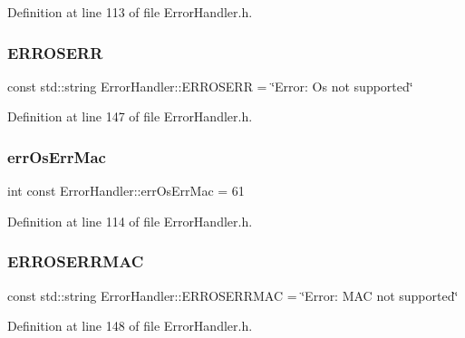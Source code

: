 Definition at line 113 of file Error\+Handler.\+h.

\mbox{\label{classErrorHandler_addc0430f69f200c95ae36b23cd0d10a6}} 
\subsubsection{\texorpdfstring{ERROSERR}{ERROSERR}}
{\footnotesize\ttfamily const std\+::string Error\+Handler\+::\+E\+R\+R\+O\+S\+E\+RR = \char`\"{}Error\+: Os not supported\char`\"{}\hspace{0.3cm}{\ttfamily [static]}}



Definition at line 147 of file Error\+Handler.\+h.

\mbox{\label{classErrorHandler_a8a55f0e95e22d240e37739a851d2fe8d}} 
\subsubsection{\texorpdfstring{errOsErrMac}{errOsErrMac}}
{\footnotesize\ttfamily int const Error\+Handler\+::err\+Os\+Err\+Mac = 61\hspace{0.3cm}{\ttfamily [static]}}



Definition at line 114 of file Error\+Handler.\+h.

\mbox{\label{classErrorHandler_a05fc7c7e84ed87c3d91eeb5336a042e3}} 
\subsubsection{\texorpdfstring{ERROSERRMAC}{ERROSERRMAC}}
{\footnotesize\ttfamily const std\+::string Error\+Handler\+::\+E\+R\+R\+O\+S\+E\+R\+R\+M\+AC = \char`\"{}Error\+: M\+AC not supported\char`\"{}\hspace{0.3cm}{\ttfamily [static]}}



Definition at line 148 of file Error\+Handler.\+h.

